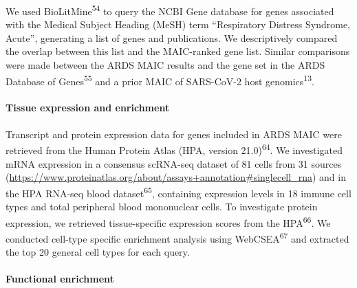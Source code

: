 \documentclass[
  11,
  a4paper,
]{article}
\let\oldparagraph\paragraph
\renewcommand{\paragraph}[1]{\oldparagraph{#1}\mbox{}}
\begin{document}
We used BioLitMine\textsuperscript{54} to query the NCBI Gene database
for genes associated with the Medical Subject Heading (MeSH) term
``Respiratory Distress Syndrome, Acute'', generating a list of genes and
publications. We descriptively compared the overlap between this list
and the MAIC-ranked gene list. Similar comparisons were made between the
ARDS MAIC results and the gene set in the ARDS Database of
Genes\textsuperscript{55} and a prior MAIC of SARS-CoV-2 host
genomics\textsuperscript{13}.

\hypertarget{tissue-expression-and-enrichment}{%
\paragraph{Tissue expression and
enrichment}\label{tissue-expression-and-enrichment}}

Transcript and protein expression data for genes included in ARDS MAIC
were retrieved from the Human Protein Atlas (HPA, version
21.0)\textsuperscript{64}. We investigated mRNA expression in a
consensus scRNA-seq dataset of 81 cells from 31 sources
(\url{https://www.proteinatlas.org/about/assays+annotation\#singlecell_rna})
and in the HPA RNA-seq blood dataset\textsuperscript{65}, containing
expression levels in 18 immune cell types and total peripheral blood
mononuclear cells. To investigate protein expression, we retrieved
tissue-specific expression scores from the HPA\textsuperscript{66}. We
conducted cell-type specific enrichment analysis using
WebCSEA\textsuperscript{67} and extracted the top 20 general cell types
for each query.

\hypertarget{functional-enrichment-1}{%
\paragraph{Functional enrichment}\label{functional-enrichment-1}}
\end{document}

